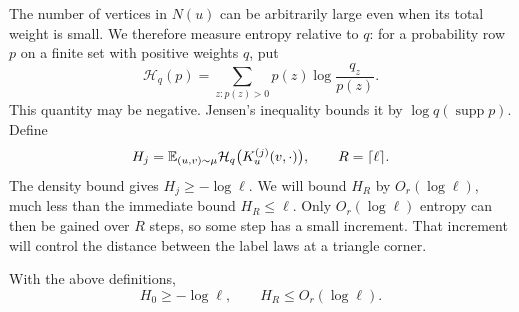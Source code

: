 The number of vertices in $N(u)$ can be arbitrarily large even when its
total weight is small.  We therefore measure entropy relative to $q$:
for a probability row $p$ on a finite set with positive weights $q$, put
\[
 \mathcal H_q(p)=\sum_{z:p(z)>0}p(z)\log\frac{q_z}{p(z)}.
\]
This quantity may be negative.  Jensen's inequality bounds it by
$\log q(\operatorname{supp}p)$.  Define
\begin{equation}
 H_j=\mathbb E_{(u,v)\sim\mu}
            \mathcal H_q\bigl(K_u^{(j)}(v,\cdot)\bigr),
 \qquad R=\lceil\ell\rceil.
 \label{eq:walk-entropy}
\end{equation}
The density bound gives $H_j\ge-\log\ell$.  We will bound $H_R$ by
$O_r(\log\ell)$, much less than the immediate bound $H_R\le\ell$.
Only $O_r(\log\ell)$ entropy can then be gained over $R$ steps, so
some step has a small increment.  That increment will control the
distance between the label laws at a triangle corner.

\begin{lemma}
\label{lem:walk-entropy-bound}
With the above definitions,
\begin{equation}
 H_0\ge-\log\ell,\qquad H_R\le O_r(\log\ell).
 \label{eq:walk-entropy-bound}
\end{equation}
\end{lemma}

